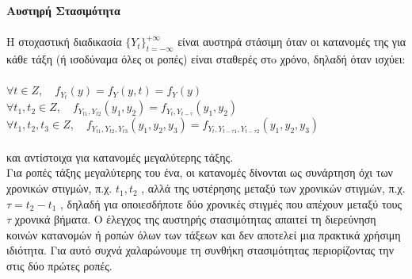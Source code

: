 \begin{dinglist}{43}
\item \textbf{ Αυστηρή Στασιμότητα} \\\\
Η στοχαστική διαδικασία $\{Y_t\}_{t=-\infty}^{+\infty}$
 είναι αυστηρά στάσιμη όταν οι κατανομές της για
κάθε τάξη (ή ισοδύναμα όλες οι ροπές) είναι σταθερές στo χρόνο, δηλαδή όταν ισχύει:\\ \\
$ \forall t \in Z, \quad f_{Y_t}\left(y\right)=f_Y\left(y,t\right)=f_Y\left(y\right) $\\
$ \forall t_1,t_2 \in Z, \quad f_{Y_{t1},Y_{t2}} \left(y_1,y_2\right)=f_{Y_t,Y_{t-\tau}}\left(y_1,y_2\right) $\\
$\forall t_1,t_2,t_3 \in Z, \quad f_{Y_{t1},Y_{t2},Y_{t3}} \left(y_1,y_2,y_3\right)=f_{Y_t,Y_{t-\tau1},Y_{t-\tau2}}\left(y_1,y_2,y_3\right)$\\\\
και αντίστοιχα για κατανομές μεγαλύτερης τάξης.\\

Για ροπές τάξης μεγαλύτερης του ένα, οι κατανομές δίνονται ως συνάρτηση όχι των
χρονικών στιγμών, π.χ. $t_1 , t_2$ , αλλά της υστέρησης μεταξύ των χρονικών στιγμών, π.χ. $\tau=t_2-t_1$ , δηλαδή για οποιεσδήποτε δύο χρονικές στιγμές που απέχουν μεταξύ τους $\tau$
χρονικά βήματα. Ο έλεγχος της αυστηρής στασιμότητας απαιτεί τη διερεύνηση
κοινών κατανομών ή ροπών όλων των τάξεων και δεν αποτελεί μια πρακτικά χρήσιμη
ιδιότητα. Για αυτό συχνά χαλαρώνουμε τη συνθήκη στασιμότητας περιορίζοντας την
στις δύο πρώτες ροπές.\\

%
%


\end{dinglist}

